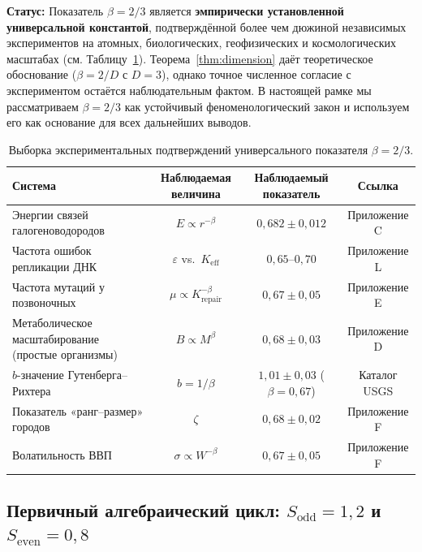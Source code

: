 \documentclass[12pt,a4paper]{article}
\begin{document}
	\textbf{Статус:} Показатель \(\beta = 2/3\) является \textbf{эмпирически установленной универсальной константой}, подтверждённой более чем дюжиной независимых экспериментов на атомных, биологических, геофизических и космологических масштабах (см. Таблицу~\ref{tab:beta-evidence}). Теорема~\ref{thm:dimension} даёт теоретическое обоснование (\(\beta = 2/D\) с \(D=3\)), однако точное численное согласие с экспериментом остаётся наблюдательным фактом. В настоящей рамке мы рассматриваем \(\beta = 2/3\) как устойчивый феноменологический закон и используем его как основание для всех дальнейших выводов.
	
	\begin{table}[htbp]
		\centering
		\caption{Выборка экспериментальных подтверждений универсального показателя \(\beta = 2/3\).}
		\label{tab:beta-evidence}
		\small
		\begin{tabular}{l c c c}
			\toprule
			Система & Наблюдаемая величина & Наблюдаемый показатель & Ссылка \\
			\midrule
			Энергии связей галогеноводородов & \(E \propto r^{-\beta}\) & \(0,682 \pm 0,012\) & Приложение C \\
			Частота ошибок репликации ДНК & \(\varepsilon\) vs.\ \(K_{\mathrm{eff}}\) & \(0,65\text{--}0,70\) & Приложение L \\
			Частота мутаций у позвоночных & \(\mu \propto K_{\mathrm{repair}}^{-\beta}\) & \(0,67 \pm 0,05\) & Приложение E \\
			Метаболическое масштабирование (простые организмы) & \(B \propto M^{\beta}\) & \(0,68 \pm 0,03\) & Приложение D \\
			\(b\)-значение Гутенберга–Рихтера & \(b = 1/\beta\) & \(1,01 \pm 0,03\) (\(\beta=0,67\)) & Каталог USGS \\
			Показатель «ранг–размер» городов & \(\zeta\) & \(0,68 \pm 0,02\) & Приложение F \\
			Волатильность ВВП & \(\sigma \propto W^{-\beta}\) & \(0,67 \pm 0,05\) & Приложение F \\
			\bottomrule
		\end{tabular}
	\end{table}
	
	\subsection{Первичный алгебраический цикл: \(S_{\mathrm{odd}} = 1,2\) и \(S_{\mathrm{even}} = 0,8\)}
	\label{sec:algebraic-loop}
	
\end{document}
